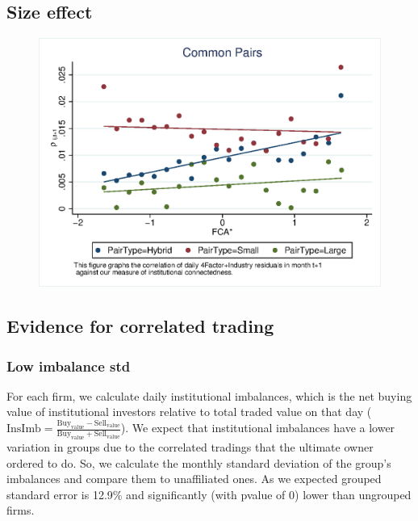 \documentclass[12pt, a4paper]{article}
\begin{document}
\FloatBarrier




\subsection{Size effect}

		\begin{figure}
			\centering  
			\includegraphics[width=0.7\linewidth]{"Output/mcorrPairType.eps"}
		\end{figure}

	
	
	\begin{table}[htbp]
		\centering
		\resizebox{1\textwidth}{!}{
			
		}
	\end{table}
	
	
	\begin{table}[htbp]
	\centering
	\resizebox{1\textwidth}{!}{
		
	}
\end{table}





\FloatBarrier

\subsection{Evidence for correlated trading }

 \subsubsection{Low imbalance std}
For each firm, we calculate daily institutional imbalances, which is the net buying value of institutional investors relative to total traded value on that day ($ \text{InsImb} = \frac{\text{Buy}_{\text{value}} - \text{Sell}_{\text{value}}}{\text{Buy}_{\text{value}} + \text{Sell}_{\text{value}}} $). 
We expect that institutional imbalances have a lower variation in groups due to the correlated tradings that the ultimate owner ordered to do. So, we calculate the monthly standard deviation of the group's imbalances and compare them to unaffiliated ones. As we expected grouped standard error is  12.9\% and significantly (with pvalue of 0) lower than ungrouped firms. 
\end{document}
